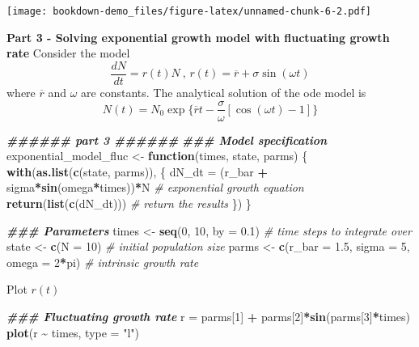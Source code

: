 \documentclass[
]{book}
\newenvironment{Shaded}{\begin{snugshade}}{\end{snugshade}}
\newcommand{\AttributeTok}[1]{\textcolor[rgb]{0.13,0.29,0.53}{#1}}
\newcommand{\CommentTok}[1]{\textcolor[rgb]{0.56,0.35,0.01}{\textit{#1}}}
\newcommand{\ControlFlowTok}[1]{\textcolor[rgb]{0.13,0.29,0.53}{\textbf{#1}}}
\newcommand{\DecValTok}[1]{\textcolor[rgb]{0.00,0.00,0.81}{#1}}
\newcommand{\DocumentationTok}[1]{\textcolor[rgb]{0.56,0.35,0.01}{\textbf{\textit{#1}}}}
\newcommand{\FloatTok}[1]{\textcolor[rgb]{0.00,0.00,0.81}{#1}}
\newcommand{\FunctionTok}[1]{\textcolor[rgb]{0.13,0.29,0.53}{\textbf{#1}}}
\newcommand{\NormalTok}[1]{#1}
\newcommand{\OtherTok}[1]{\textcolor[rgb]{0.56,0.35,0.01}{#1}}
\newcommand{\SpecialCharTok}[1]{\textcolor[rgb]{0.81,0.36,0.00}{\textbf{#1}}}
\newcommand{\StringTok}[1]{\textcolor[rgb]{0.31,0.60,0.02}{#1}}
\begin{document}
\texttt{[image: bookdown-demo\_files/figure-latex/unnamed-chunk-6-2.pdf]}

\textbf{Part 3 - Solving exponential growth model with fluctuating growth rate}
Consider the model
\[
\frac{dN}{dt} = r(t)N \ \text{, } r(t) = \overline{r} + \sigma\sin(\omega t)
\]
where \(\overline{r}\) and \(\omega\) are constants.
The analytical solution of the ode model is
\[
N(t) = N_0\exp\{\overline{r}t - \frac{\sigma}{\omega}[\cos(\omega t) - 1]\}
\]

\begin{Shaded}
\begin{Highlighting}[]
\DocumentationTok{\#\#\#\#\#\# part 3 \#\#\#\#\#\#}
\DocumentationTok{\#\#\# Model specification}
\NormalTok{exponential\_model\_fluc }\OtherTok{\textless{}{-}} \ControlFlowTok{function}\NormalTok{(times, state, parms) \{}
  \FunctionTok{with}\NormalTok{(}\FunctionTok{as.list}\NormalTok{(}\FunctionTok{c}\NormalTok{(state, parms)), \{}
\NormalTok{    dN\_dt }\OtherTok{=}\NormalTok{ (r\_bar }\SpecialCharTok{+}\NormalTok{ sigma}\SpecialCharTok{*}\FunctionTok{sin}\NormalTok{(omega}\SpecialCharTok{*}\NormalTok{times))}\SpecialCharTok{*}\NormalTok{N  }\CommentTok{\# exponential growth equation}
    \FunctionTok{return}\NormalTok{(}\FunctionTok{list}\NormalTok{(}\FunctionTok{c}\NormalTok{(dN\_dt)))  }\CommentTok{\# return the results}
\NormalTok{  \})}
\NormalTok{\}}
\end{Highlighting}
\end{Shaded}

\begin{Shaded}
\begin{Highlighting}[]
\DocumentationTok{\#\#\# Parameters}
\NormalTok{times }\OtherTok{\textless{}{-}} \FunctionTok{seq}\NormalTok{(}\DecValTok{0}\NormalTok{, }\DecValTok{10}\NormalTok{, }\AttributeTok{by =} \FloatTok{0.1}\NormalTok{)  }\CommentTok{\# time steps to integrate over}
\NormalTok{state }\OtherTok{\textless{}{-}} \FunctionTok{c}\NormalTok{(}\AttributeTok{N =} \DecValTok{10}\NormalTok{)  }\CommentTok{\# initial population size}
\NormalTok{parms }\OtherTok{\textless{}{-}} \FunctionTok{c}\NormalTok{(}\AttributeTok{r\_bar =} \FloatTok{1.5}\NormalTok{, }\AttributeTok{sigma =} \DecValTok{5}\NormalTok{, }\AttributeTok{omega =} \DecValTok{2}\SpecialCharTok{*}\NormalTok{pi)  }\CommentTok{\# intrinsic growth rate}
\end{Highlighting}
\end{Shaded}

Plot \(r(t)\)

\begin{Shaded}
\begin{Highlighting}[]
\DocumentationTok{\#\#\# Fluctuating growth rate}
\NormalTok{r }\OtherTok{=}\NormalTok{ parms[}\DecValTok{1}\NormalTok{] }\SpecialCharTok{+}\NormalTok{ parms[}\DecValTok{2}\NormalTok{]}\SpecialCharTok{*}\FunctionTok{sin}\NormalTok{(parms[}\DecValTok{3}\NormalTok{]}\SpecialCharTok{*}\NormalTok{times)}
\FunctionTok{plot}\NormalTok{(r }\SpecialCharTok{\textasciitilde{}}\NormalTok{ times, }\AttributeTok{type =} \StringTok{"l"}\NormalTok{)}
\end{Highlighting}
\end{Shaded}
\end{document}
